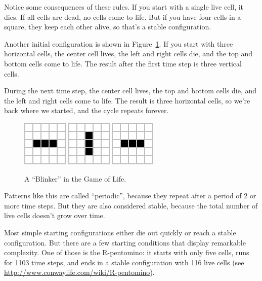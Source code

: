 
Notice some consequences of these rules.
If you start with a single live cell, it dies.
If all cells are dead, no cells come to life.
But if you have four cells in a square, they keep each other alive, so that's a stable configuration.

Another initial configuration is shown in Figure~\ref{fig:blinker}.
If you start with three horizontal cells, the center cell lives, the left and right cells die, and the top and bottom cells come to life.
The result after the first time step is three vertical cells.

During the next time step, the center cell lives, the top and bottom cells die, and the left and right cells come to life.
The result is three horizontal cells, so we're back where we started, and the cycle repeats forever.

\begin{figure}[!ht]
\begin{center}
\includegraphics{figs/blinker-0.png}
\raisebox{38pt}{~$\longrightarrow$~}
\includegraphics{figs/blinker-1.png}
\raisebox{38pt}{~$\longrightarrow$~}
\includegraphics{figs/blinker-0.png}
\raisebox{38pt}{~$\longrightarrow$~ \ldots}
\caption{A ``Blinker'' in the Game of Life.}
\label{fig:blinker}
\end{center}
\end{figure}

Patterns like this are called ``periodic'', because they repeat after a period of 2 or more time steps.
But they are also considered stable, because the total number of live cells doesn't grow over time.

Most simple starting configurations either die out quickly or reach a stable configuration.
But there are a few starting conditions that display remarkable complexity.
One of those is the R-pentomino: it starts with only five cells, runs for 1103 time steps, and ends in a stable configuration with 116 live cells (see \url{http://www.conwaylife.com/wiki/R-pentomino}).

